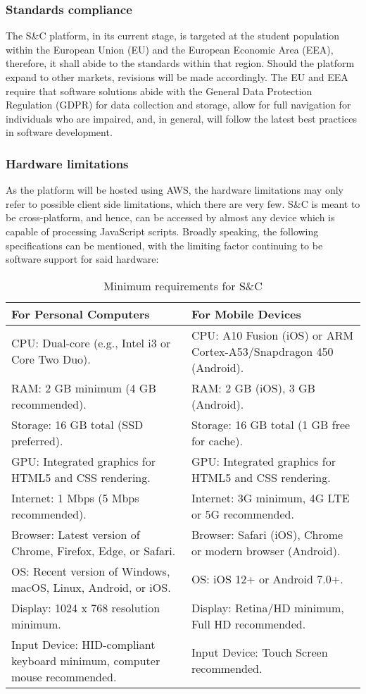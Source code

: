 \subsubsection{Standards compliance}
The S\&C platform, in its current stage, is targeted at the student population within the European Union (EU) and the European Economic Area (EEA), therefore, it shall abide to the standards within that region. Should the platform expand to other markets, revisions will be made accordingly.
The EU and EEA require that software solutions abide with the General Data Protection Regulation (GDPR) for data collection and storage, allow for full navigation for individuals who are impaired, and, in general, will follow the latest best practices in software development.
\subsubsection{Hardware limitations}
As the platform will be hosted using AWS, the hardware limitations may only refer to possible client side limitations, which there are very few. S\&C is meant to be cross-platform, and hence, can be accessed by almost any device which is capable of processing JavaScript scripts. Broadly speaking, the following specifications can be mentioned, with the limiting factor continuing to be software support for said hardware:

\begin{table}[h!]
\centering
\begin{tabular}{|>{\raggedright\arraybackslash}p{6cm}|>{\raggedright\arraybackslash}p{6cm}|}
\hline
\textbf{For Personal Computers} & \textbf{For Mobile Devices} \\ \hline
CPU: Dual-core (e.g., Intel i3 or Core Two Duo). & CPU: A10 Fusion (iOS) or ARM Cortex-A53/Snapdragon 450 (Android). \\ \hline
RAM: 2 GB minimum (4 GB recommended). & RAM: 2 GB (iOS), 3 GB (Android). \\ \hline
Storage: 16 GB total (SSD preferred). & Storage: 16 GB total (1 GB free for cache). \\ \hline
GPU: Integrated graphics for HTML5 and CSS rendering. & GPU: Integrated graphics for HTML5 and CSS rendering. \\ \hline
Internet: 1 Mbps (5 Mbps recommended). & Internet: 3G minimum, 4G LTE or 5G recommended. \\ \hline
Browser: Latest version of Chrome, Firefox, Edge, or Safari. & Browser: Safari (iOS), Chrome or modern browser (Android). \\ \hline
OS: Recent version of Windows, macOS, Linux, Android, or iOS. & OS: iOS 12+ or Android 7.0+. \\ \hline
Display: 1024 x 768 resolution minimum. & Display: Retina/HD minimum, Full HD recommended.  \\ \hline
Input Device: HID-compliant keyboard minimum, computer mouse recommended. & Input Device: Touch Screen recommended.\\ \hline
\end{tabular}
\caption{Minimum requirements for S\&C}
\label{tab:hardware-specs}
\end{table}

